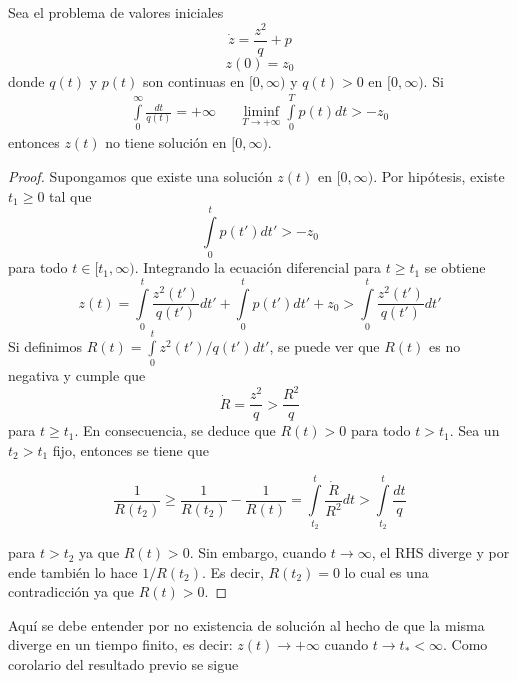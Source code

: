 \begin{lemma}\label{lema Riccati 1}
Sea el problema de valores iniciales
$$
\dot{z}=\frac{z^2}{q} + p
$$
$$
z(0)=z_0
$$
donde $q(t)$ y $p(t)$ son continuas en $[0,\infty)$ y $q(t)>0$ en $[0,\infty)$. Si
\begin{align*}
    \int\limits_0^\infty \frac{dt}{q(t)}=+\infty & & \liminf_{T\to +\infty}\int\limits_0^T p(t)dt>-z_0
\end{align*}
entonces $z(t)$ no tiene solución en $[0,\infty)$.
\end{lemma}
\begin{proof}
Supongamos que existe una solución $z(t)$ en $[0,\infty)$. Por hipótesis, existe $t_1\geq 0$ tal que
$$
\int\limits_0^t p(t')dt'>-z_0
$$
para todo $t\in[t_1,\infty)$. Integrando la ecuación diferencial para $t\geq t_1$ se obtiene
$$
z(t)=\int\limits_0^t \frac{z^2(t')}{q(t')}dt' + \int\limits_0^t p(t')dt' + z_0 > \int\limits_0^t \frac{z^2(t')}{q(t')}dt'
$$
Si definimos $R(t)=\int\limits_0^t z^2(t')/q(t') dt'$, se puede ver que $R(t)$ es no negativa y cumple que 
$$
\dot{R}=\frac{z^2}{q}>\frac{R^2}{q}
$$
para $t\geq t_1$. En consecuencia, se deduce que $R(t)>0$ para todo $t>t_1$. Sea un $t_2>t_1$ fijo, entonces se tiene que 

\begin{equation}\label{R(t)}
    \frac{1}{R(t_2)}\geq \frac{1}{R(t_2)}-\frac{1}{R(t)}=\int\limits_{t_2}^t \frac{\dot{R}}{R^2}dt > \int\limits_{t_2}^t\frac{dt}{q}
\end{equation}

para $t>t_2$ ya que $R(t)>0$. Sin embargo, cuando $t\rightarrow\infty$, el RHS diverge y por ende también lo hace $1/R(t_2)$. Es decir, $R(t_2)=0$ lo cual es una contradicción ya que $R(t)>0$. 
\end{proof}



Aquí se debe entender por no existencia de solución al hecho de que la misma diverge en un tiempo finito, es decir: $z(t)\rightarrow +\infty$ cuando $t\rightarrow t_*<\infty$. Como corolario del resultado previo se sigue



